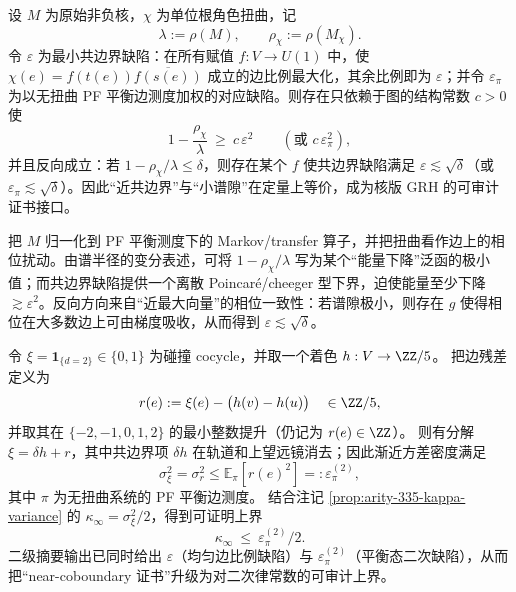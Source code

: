 

\begin{conjecture}\label{conj:coboundary-defect-gap}
设 $M$ 为原始非负核，$\chi$ 为单位根角色扭曲，记
$$
\lambda:=\rho(M),\qquad \rho_\chi:=\rho(M_\chi).
$$
令 \(\varepsilon\) 为最小共边界缺陷：在所有赋值 \(f:V\to U(1)\) 中，使
\(
\chi(e)=f(t(e))\overline{f(s(e))}
\)
成立的边比例最大化，其余比例即为 \(\varepsilon\)；并令 \(\varepsilon_\pi\) 为以无扭曲 PF 平衡边测度加权的对应缺陷。则存在只依赖于图的结构常数 \(c>0\) 使
$$
1-\frac{\rho_\chi}{\lambda}\ \ge\ c\,\varepsilon^2
\qquad(\text{或 }c\,\varepsilon_\pi^2),
$$
并且反向成立：若 \(1-\rho_\chi/\lambda\le \delta\)，则存在某个 \(f\) 使共边界缺陷满足 \(\varepsilon\lesssim \sqrt{\delta}\)（或 \(\varepsilon_\pi\lesssim \sqrt{\delta}\)）。因此“近共边界”与“小谱隙”在定量上等价，成为核版 GRH 的可审计证书接口。
\end{conjecture}

\begin{remark}\label{rem:coboundary-defect-proof}
把 $M$ 归一化到 PF 平衡测度下的 Markov/transfer 算子，并把扭曲看作边上的相位扰动。由谱半径的变分表述，可将 $1-\rho_\chi/\lambda$ 写为某个“能量下降”泛函的极小值；而共边界缺陷提供一个离散 Poincar\'e/cheeger 型下界，迫使能量至少下降 \(\gtrsim \varepsilon^2\)。反向方向来自“近最大向量”的相位一致性：若谱隙极小，则存在 $g$ 使得相位在大多数边上可由梯度吸收，从而得到 \(\varepsilon\lesssim \sqrt{\delta}\)。
\end{remark}

\begin{remark}[从“最佳着色”得到的可证明上界：\texorpdfstring{$\kappa_\infty\le \varepsilon_\pi^{(2)}/2$}{kappa <= eps/2}]\label{rem:arity-335-eps-bound}
令 \(\xi=\mathbf{1}_{\{d=2\}}\in\{0,1\}\) 为碰撞 cocycle，并取一个着色 \(h:V\to\ZZ/5\)。
把边残差定义为
$$
r(e):=\xi(e)-\bigl(h(v)-h(u)\bigr)\quad\in\ZZ/5,
$$
并取其在 \(\{-2,-1,0,1,2\}\) 的最小整数提升（仍记为 \(r(e)\in\ZZ\)）。
则有分解 \(\xi=\delta h+r\)，其中共边界项 \(\delta h\) 在轨道和上望远镜消去；因此渐近方差密度满足
$$
\sigma_\xi^2=\sigma_r^2\le \mathbb{E}_\pi[r(e)^2]=:\varepsilon_\pi^{(2)},
$$
其中 \(\pi\) 为无扭曲系统的 PF 平衡边测度。
结合注记 \ref{prop:arity-335-kappa-variance} 的 \(\kappa_\infty=\sigma_\xi^2/2\)，得到可证明上界
$$
\kappa_\infty\ \le\ \varepsilon_\pi^{(2)}/2.
$$
二级摘要输出已同时给出 \(\varepsilon\)（均匀边比例缺陷）与 \(\varepsilon_\pi^{(2)}\)（平衡态二次缺陷），从而把“near-coboundary 证书”升级为对二次律常数的可审计上界。
\end{remark}

